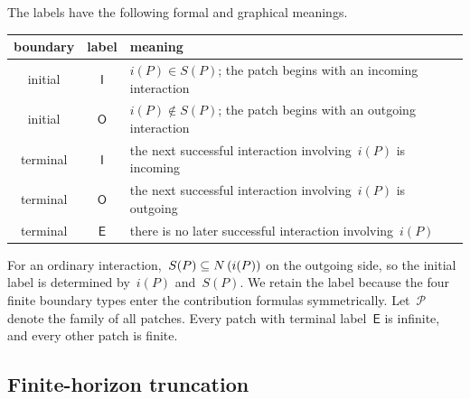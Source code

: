 The labels have the following formal and graphical meanings.
\begin{center}
\small
\begin{tabular}{c c p{}}
\hline
boundary & label & meaning \\
\hline
initial & $\mathsf I$ & $i(P)\in S(P)$; the patch begins with an incoming interaction \\
initial & $\mathsf O$ & $i(P)\notin S(P)$; the patch begins with an outgoing interaction \\
terminal & $\mathsf I$ & the next successful interaction involving~$i(P)$ is incoming \\
terminal & $\mathsf O$ & the next successful interaction involving~$i(P)$ is outgoing \\
terminal & $\mathsf E$ & there is no later successful interaction involving~$i(P)$ \\
\hline
\end{tabular}
\end{center}
For an ordinary interaction,~$S(P)\subseteq N\left(i(P)\right)$ on the outgoing side,
so the initial label is determined by~$i(P)$ and~$S(P)$. We retain the label
because the four finite boundary types enter the contribution formulas
symmetrically. Let~$\mathcal P$ denote the family of all patches. Every patch
with terminal label~$\mathsf E$ is infinite, and every other patch is finite.


\subsection{Finite-horizon truncation}
\label{subsec:patch-truncation}

